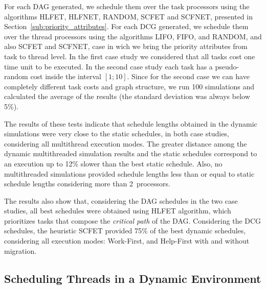 \documentclass[twocolumn]{svjour3}
\begin{document}
{\color{blue}

For each DAG generated, we schedule them over the task processors using the algorithms HLFET, HLFNET, RANDOM, SCFET and SCFNET, presented in Section~\ref{sub:priority_attributes}. For each DCG generated, we schedule them over the thread processors using the algorithms LIFO, FIFO, and RANDOM, and also SCFET and SCFNET, case in wich we bring the priority attributes from task to thread level. In the first case study we considered that all tasks cost one time unit to be executed. In the second case study each task has a pseudo-random cost inside the interval $[1;10]$. Since for the second case we can have completely different task costs and graph structure, we run 100 simulations and calculated the average of the results (the standard deviation was always below 5\%).

The results of these tests indicate that schedule lengths obtained in the dynamic simulations were very close to the static schedules, in both case studies, considering all multithread execution modes. The greater distance among the dynamic multithreaded simulation results and the static schedules correspond to an execution up to 12\% slower than the best static schedule. Also, no multithreaded simulations provided schedule lengths less than or equal to static schedule lengths considering more than 2~processors.

The results also show that, considering the DAG schedules in the two case studies, all best schedules were obtained using HLFET algorithm, which prioritizes tasks that compose the \textit{critical path} of the DAG. Considering the DCG schedules, the heuristic SCFET provided 75\% of the best dynamic schedules, considering all execution modes: Work-First, and Help-First with and without migration.

}

\subsection{Scheduling Threads in a Dynamic Environment}
\end{document}
